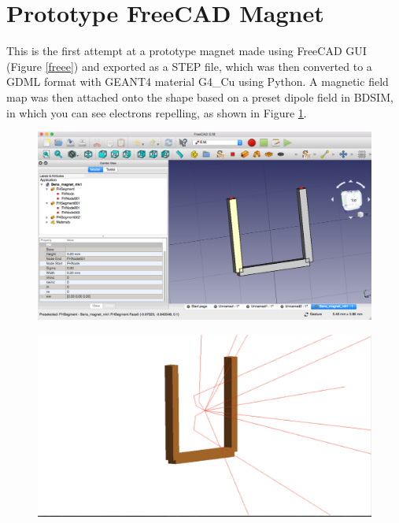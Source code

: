 \documentclass[12pt,a4paper]{article}
\begin{document}
\section{Prototype FreeCAD Magnet}
\label{mag}
This is the first attempt at a prototype magnet made using FreeCAD GUI (Figure \ref{freee}) and exported as a STEP file, which was then converted to a GDML format with GEANT4 material G4\_Cu using Python. A magnetic field map was then attached onto the shape based on a preset dipole field in BDSIM, in which you can see electrons repelling, as shown in Figure \ref{repel}.

\begin{figure}[h!]
\centering
\begin{minipage}{.5\textwidth}
  \centering
  \includegraphics[height=0.5\linewidth]{Images//CAD_Mag//maginfreeCAD.png}
  \label{freee}
\end{minipage}%
\begin{minipage}{.5\textwidth}
  \centering
  \includegraphics[height=.5\linewidth]{Images//CAD_Mag//maginbdsim.png}
  \label{repel}
\end{minipage}%
\end{figure}
\end{document}

